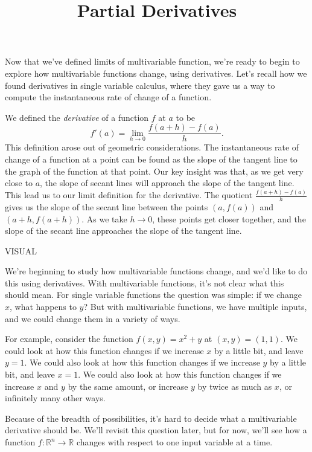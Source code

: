 \documentclass{ximera}
\title{Partial Derivatives}
\begin{document}
\begin{abstract}
\end{abstract}
\maketitle

Now that we've defined limits of multivariable function, we're ready to begin to explore how multivariable functions change, using derivatives. Let's recall how we found derivatives in single variable calculus, where they gave us a way to compute the instantaneous rate of change of a function.

We defined the \emph{derivative} of a function $f$ at $a$ to be
\[
f'(a) = \lim_{h\rightarrow 0}\frac{f(a+h)-f(a)}{h}.
\]
This definition arose out of geometric considerations. The instantaneous rate of change of a function at a point can be found as the slope of the tangent line to the graph of the function at that point. Our key insight was that, as we get very close to $a$, the slope of secant lines will approach the slope of the tangent line. This lead us to our limit definition for the derivative. The quotient $\frac{f(a+h)-f(a)}{h}$ gives us the slope of the secant line between the points $(a,f(a))$ and $(a+h, f(a+h))$. As we take $h\rightarrow 0$, these points get closer together, and the slope of the secant line approaches the slope of the tangent line.

VISUAL

We're beginning to study how multivariable functions change, and we'd like to do this using derivatives. With multivariable functions, it's not clear what this should mean. For single variable functions the question was simple: if we change $x$, what happens to $y$? But with multivariable functions, we have multiple inputs, and we could change them in a variety of ways.

For example, consider the function $f(x,y) = x^2+y$ at $(x,y)=(1,1)$. We could look at how this function changes if we increase $x$ by a little bit, and leave $y=1$. We could also look at how this function changes if we increase $y$ by a little bit, and leave $x=1$. We could also look at how this function changes if we increase $x$ and $y$ by the same amount, or increase $y$ by twice as much as $x$, or infinitely many other ways.

Because of the breadth of possibilities, it's hard to decide what a multivariable derivative should be. We'll revisit this question later, but for now, we'll see how a function $f:\mathbb{R}^n\rightarrow \mathbb{R}$ changes with respect to one input variable at a time.
\end{document}
